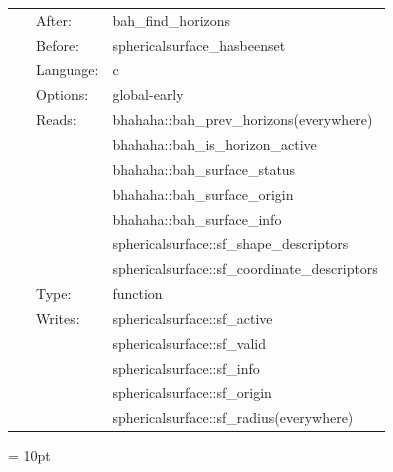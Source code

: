 \documentclass[a4paper,11pt]{article}
\begin{document}
 \begin{tabular*}{160mm}{cll} 
~ & After:  & bah\_find\_horizons \\ 
~ & Before:  & sphericalsurface\_hasbeenset \\ 
~ & Language:  & c \\ 
~ & Options:  & global-early \\ 
~ & Reads:  & bhahaha::bah\_prev\_horizons(everywhere) \\ 
~& ~ &bhahaha::bah\_is\_horizon\_active\\ 
~& ~ &bhahaha::bah\_surface\_status\\ 
~& ~ &bhahaha::bah\_surface\_origin\\ 
~& ~ &bhahaha::bah\_surface\_info\\ 
~& ~ &sphericalsurface::sf\_shape\_descriptors\\ 
~& ~ &sphericalsurface::sf\_coordinate\_descriptors\\ 
~ & Type:  & function \\ 
~ & Writes:  & sphericalsurface::sf\_active \\ 
~& ~ &sphericalsurface::sf\_valid\\ 
~& ~ &sphericalsurface::sf\_info\\ 
~& ~ &sphericalsurface::sf\_origin\\ 
~& ~ &sphericalsurface::sf\_radius(everywhere)\\ 
\end{tabular*} 



\vspace{5mm}\parskip = 10pt 
\end{document}
